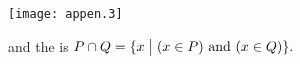 \begin{center}
  \texttt{[image: appen.3]}
%
%
%
%
%
%
%
%
\end{center}
and the  is
\( P\cap Q=\mbox{$\{x\bigm| \text{$(x\in P)$ and $(x\in Q)$}\}$}. \)

